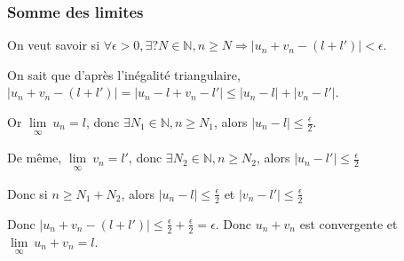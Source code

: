 \documentclass[french]{yLectureNote}
\newcommand{\Lim}[1]{\lim\limits_{\substack{#1}}\:}
\begin{document}
\subsubsection{Somme des limites}
\begin{myproof}
On veut savoir si $\forall\epsilon > 0, \exists ? N \in \mathbb{N}, n\geq N \Rightarrow |u_n + v_n - (l+l')|< \epsilon$.

On sait que d'après l'inégalité triangulaire, $|u_n + v_n - (l+l')| = |u_n -l + v_n -l'| \leq |u_n-l|+|v_n-l'|$.

Or $\Lim{\infty} u_n = l$, donc $\exists N_1\in\mathbb{N},  n \geq N_1$, alors $|u_n-l| \leq \frac{\epsilon}{2}$.

De m\^eme, $\Lim{\infty} v_n = l'$, donc $\exists N_2\in\mathbb{N},  n \geq N_2$, alors $|u_n-l'| \leq \frac{\epsilon}{2}$

Donc si $n\geq N_1+N_2$, alors $|u_n-l| \leq \frac{\epsilon}{2}$ et $|v_n-l'| \leq \frac{\epsilon}{2}$

Donc $|u_n + v_n - (l+l')| \leq \frac{\epsilon}{2} + \frac{\epsilon}{2} = \epsilon$. Donc $u_n+v_n$ est convergente et $\Lim{\infty} u_n+v_n = l$.
\end{myproof}
\end{document}
